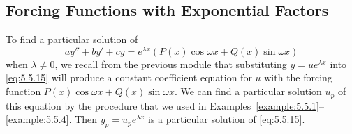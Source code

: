 \documentclass{ximera}
\begin{document}
\subsection*{Forcing Functions with Exponential Factors}

To find a particular solution of
\begin{equation} \label{eq:5.5.15}
ay''+by'+cy=e^{\lambda x}\left(P(x)\cos \omega x+Q(x)\sin \omega x\right)
\end{equation}
when $\lambda\neq 0$, we recall from the previous module that
substituting $y=ue^{\lambda x}$ into \eqref{eq:5.5.15} will produce a
constant coefficient equation for $u$  with  the forcing
function  $P(x)\cos \omega x+Q(x)\sin \omega x$. We can find a
particular solution $u_p$ of this equation by the procedure that we
used in Examples~\ref{example:5.5.1}--\ref{example:5.5.4}. Then
$y_p=u_pe^{\lambda x}$ is a particular solution of \eqref{eq:5.5.15}.
\end{document}
